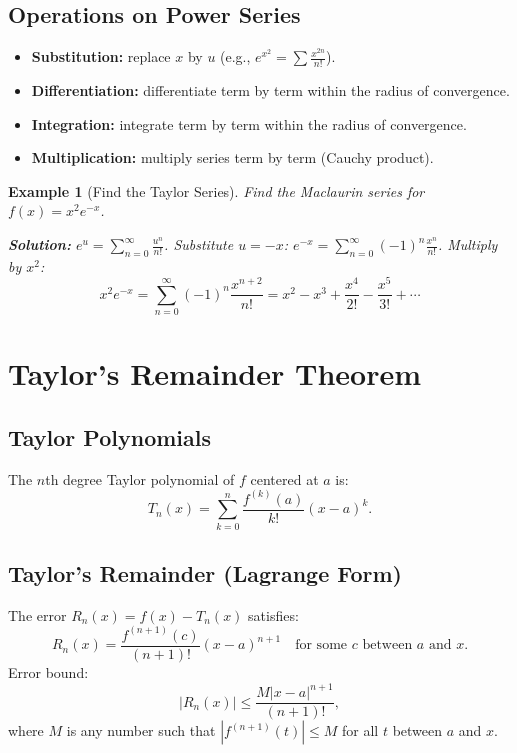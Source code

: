 \documentclass[12pt]{article}
\newtheorem{example}{Example}[section]
\begin{document}
\subsection{Operations on Power Series}
\begin{itemize}
    \item \textbf{Substitution:} replace \(x\) by \(u\) (e.g., \(e^{x^2} = \sum \frac{x^{2n}}{n!}\)).
    \item \textbf{Differentiation:} differentiate term by term within the radius of convergence.
    \item \textbf{Integration:} integrate term by term within the radius of convergence.
    \item \textbf{Multiplication:} multiply series term by term (Cauchy product).
\end{itemize}

\begin{example}[Find the Taylor Series]
Find the Maclaurin series for \(f(x)=x^2 e^{-x}\).

\textbf{Solution:} \(e^u = \sum_{n=0}^{\infty} \frac{u^n}{n!}\). Substitute \(u=-x\): \(e^{-x} = \sum_{n=0}^{\infty} (-1)^n \frac{x^n}{n!}\).  
Multiply by \(x^2\):
\[
x^2 e^{-x} = \sum_{n=0}^{\infty} (-1)^n \frac{x^{n+2}}{n!} = x^2 - x^3 + \frac{x^4}{2!} - \frac{x^5}{3!} + \cdots
\]
\end{example}

\section{Taylor's Remainder Theorem}

\subsection{Taylor Polynomials}
The \(n\)th degree Taylor polynomial of \(f\) centered at \(a\) is:
\[
T_n(x) = \sum_{k=0}^{n} \frac{f^{(k)}(a)}{k!}(x-a)^k.
\]

\subsection{Taylor's Remainder (Lagrange Form)}
The error \(R_n(x)=f(x)-T_n(x)\) satisfies:
\[
\boxed{R_n(x) = \frac{f^{(n+1)}(c)}{(n+1)!}(x-a)^{n+1} \quad \text{for some } c \text{ between } a \text{ and } x.}
\]
Error bound:
\[
|R_n(x)| \le \frac{M|x-a|^{n+1}}{(n+1)!},
\]
where \(M\) is any number such that \(|f^{(n+1)}(t)|\le M\) for all \(t\) between \(a\) and \(x\).
\end{document}
